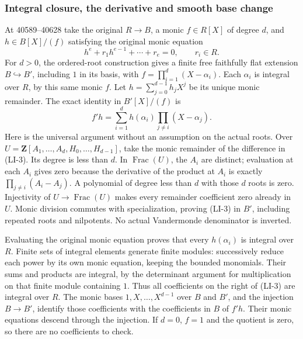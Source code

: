\subsubsection{Integral closure, the derivative and smooth base change}\label{algebra-proof-054-integral-closure-the-derivative-and-smooth-base-change}

At 40589--40628 take the original \(R\to B\), a monic \(f\in R[X]\) of degree \(d\), and \(h\in B[X]/(f)\) satisfying the original monic equation \[
h^e+r_1h^{e-1}+\cdots+r_e=0,\qquad r_i\in R.
\] For \(d>0\), the ordered-root construction gives a finite free faithfully flat extension \(B\hookrightarrow B'\), including \(1\) in its basis, with \(f=\prod_{i=1}^d(X-\alpha_i)\). Each \(\alpha_i\) is integral over \(R\), by this same monic \(f\). Let \(h=\sum_{j=0}^{d-1}h_jX^j\) be its unique monic remainder. The exact identity in \(B'[X]/(f)\) is \[
f'h=\sum_{i=1}^d h(\alpha_i)\prod_{j\ne i}(X-\alpha_j).
\tag{LI-3}
\] Here is the universal argument without an assumption on the actual roots. Over \(U=\mathbf Z[A_1,\ldots,A_d,H_0,\ldots,H_{d-1}]\), take the monic remainder of the difference in (LI-3). Its degree is less than \(d\). In \(\operatorname{Frac}(U)\), the \(A_i\) are distinct; evaluation at each \(A_i\) gives zero because the derivative of the product at \(A_i\) is exactly \(\prod_{j\ne i}(A_i-A_j)\). A polynomial of degree less than \(d\) with those \(d\) roots is zero. Injectivity of \(U\to\operatorname{Frac}(U)\) makes every remainder coefficient zero already in \(U\). Monic division commutes with specialization, proving (LI-3) in \(B'\), including repeated roots and nilpotents. No actual Vandermonde denominator is inverted.

Evaluating the original monic equation proves that every \(h(\alpha_i)\) is integral over \(R\). Finite sets of integral elements generate finite modules: successively reduce each power by its own monic equation, keeping the bounded monomials. Their sums and products are integral, by the determinant argument for multiplication on that finite module containing \(1\). Thus all coefficients on the right of (LI-3) are integral over \(R\). The monic bases \(1,X,\ldots,X^{d-1}\) over \(B\) and \(B'\), and the injection \(B\to B'\), identify those coefficients with the coefficients in \(B\) of \(f'h\). Their monic equations descend through the injection. If \(d=0\), \(f=1\) and the quotient is zero, so there are no coefficients to check.

